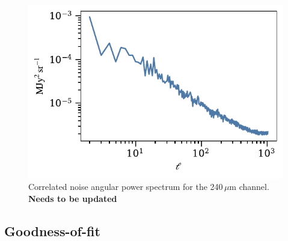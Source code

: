 \documentclass{aa}
\begin{document}
\begin{figure}
	\centering
	\includegraphics[width=\columnwidth]{figs/ncorr_powerspec.pdf}
	\caption{Correlated noise angular power spectrum for the 240$\,\mu$m channel.
	\textbf{Needs to be updated}}
	\label{fig:ncorrpowspec}
\end{figure}


\subsection{Goodness-of-fit}
\end{document}
